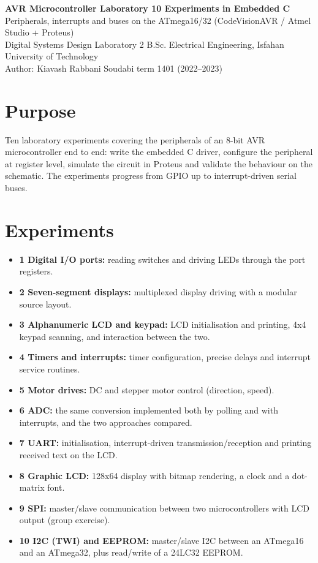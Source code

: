 \documentclass[10pt,a4paper]{article}
\begin{document}
\begin{center}
{\Large\bfseries AVR Microcontroller Laboratory \textendash{} 10 Experiments in Embedded C}\\[2pt]
{\large Peripherals, interrupts and buses on the ATmega16/32 (CodeVisionAVR / Atmel Studio + Proteus)}\\[4pt]
{\small Digital Systems Design Laboratory 2 \textendash{} B.Sc. Electrical Engineering, Isfahan University of Technology}\\
{\small Author: Kiavash Rabbani Soudabi \textendash{} term 1401 (2022--2023)}
\end{center}

\section*{Purpose}
Ten laboratory experiments covering the peripherals of an 8-bit AVR microcontroller end to end: write the embedded C
driver, configure the peripheral at register level, simulate the circuit in Proteus and validate the behaviour on the
schematic. The experiments progress from GPIO up to interrupt-driven serial buses.

\section*{Experiments}
\begin{itemize}
  \item \textbf{1 \textendash{} Digital I/O ports:} reading switches and driving LEDs through the port registers.
  \item \textbf{2 \textendash{} Seven-segment displays:} multiplexed display driving with a modular source layout.
  \item \textbf{3 \textendash{} Alphanumeric LCD and keypad:} LCD initialisation and printing, 4x4 keypad scanning,
        and interaction between the two.
  \item \textbf{4 \textendash{} Timers and interrupts:} timer configuration, precise delays and interrupt service
        routines.
  \item \textbf{5 \textendash{} Motor drives:} DC and stepper motor control (direction, speed).
  \item \textbf{6 \textendash{} ADC:} the same conversion implemented both by polling and with interrupts, and the two
        approaches compared.
  \item \textbf{7 \textendash{} UART:} initialisation, interrupt-driven transmission/reception and printing received
        text on the LCD.
  \item \textbf{8 \textendash{} Graphic LCD:} 128x64 display with bitmap rendering, a clock and a dot-matrix font.
  \item \textbf{9 \textendash{} SPI:} master/slave communication between two microcontrollers with LCD output (group
        exercise).
  \item \textbf{10 \textendash{} I2C (TWI) and EEPROM:} master/slave I2C between an ATmega16 and an ATmega32, plus
        read/write of a 24LC32 EEPROM.
\end{itemize}
\end{document}
